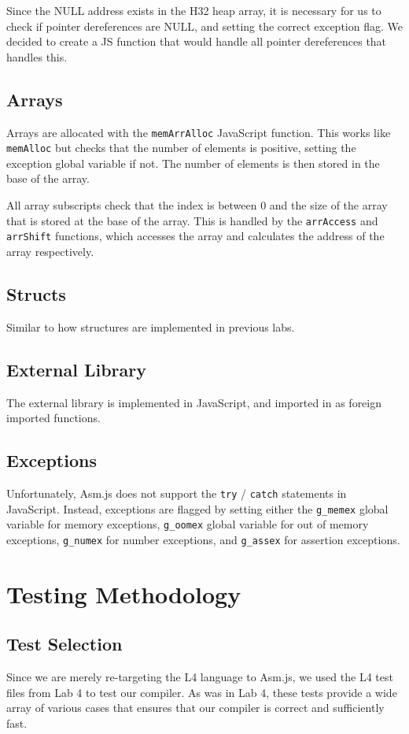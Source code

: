 \documentclass[twoside]{article}
\begin{document}
\begin{multicols}{2}
    Since the NULL address exists in the H32 heap array, it is necessary for
    us to check if pointer dereferences are NULL, and setting the correct
    exception flag. We decided to create a JS function that would handle all
    pointer dereferences that handles this.
  \subsection{Arrays}
    Arrays are allocated with the \texttt{memArrAlloc} JavaScript function. This
    works like \texttt{memAlloc} but checks that the number of elements is
    positive, setting the exception global variable if not. The number of elements
    is then stored in the base of the array.

    All array subscripts check that the index is between 0 and the size of the
    array that is stored at the base of the array. This is handled by the
    \texttt{arrAccess} and \texttt{arrShift} functions, which accesses the array
    and calculates the address of the array respectively.
  \subsection{Structs}
    Similar to how structures are implemented in previous labs.
  \subsection{External Library}
    The external library is implemented in JavaScript, and imported in as foreign
    imported functions.
  \subsection{Exceptions}
    Unfortunately, Asm.js does not support the \texttt{try} / \texttt{catch}
    statements in JavaScript.
    Instead, exceptions are flagged by setting either the \texttt{g\_memex} global variable
    for memory exceptions, \texttt{g\_oomex} global variable for out of memory
    exceptions, \texttt{g\_numex} for number exceptions, and \texttt{g\_assex} for
    assertion exceptions.


\section{Testing Methodology}

\subsection{Test Selection}
Since we are merely re-targeting the L4 language to Asm.js, we used the L4 test
files from Lab 4 to test our compiler. As was in Lab 4, these tests provide a
wide array of various cases that ensures that our compiler is correct and
sufficiently fast.


\end{multicols}
\end{document}
